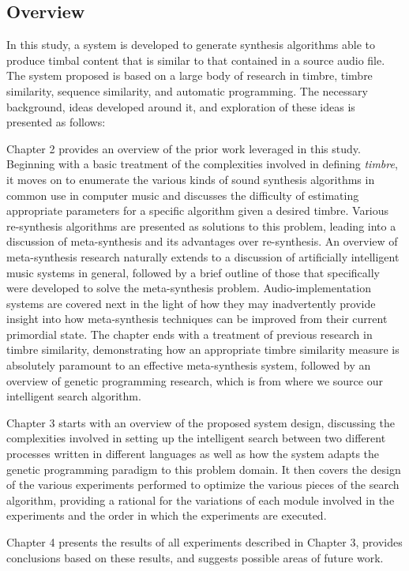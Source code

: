 \documentclass[a4paper,12pt]{report} 	%
\numberwithin{figure}{chapter}
\numberwithin{table}{chapter}
\numberwithin{equation}{chapter}
\begin{document}
\begin{flushleft}
\section{Overview}
In this study, a system is developed to generate synthesis algorithms able to produce timbal content that is similar to that contained in a source audio file. The system proposed is based on a large body of research in timbre, timbre similarity, sequence similarity, and automatic programming. The necessary background, ideas developed around it, and exploration of these ideas is presented as follows:

Chapter 2 provides an overview of the prior work leveraged in this study. Beginning with a basic treatment of the complexities involved in defining \emph{timbre}, it moves on to enumerate the various kinds of sound synthesis algorithms in common use in computer music and discusses the difficulty of estimating appropriate parameters for a specific algorithm given a desired timbre. Various re-synthesis algorithms are presented as solutions to this problem, leading into a discussion of meta-synthesis and its advantages over re-synthesis. An overview of meta-synthesis research naturally extends to a discussion of artificially intelligent music systems in general, followed by a brief outline of those that specifically were developed to solve the meta-synthesis problem. Audio-implementation systems are covered next in the light of how they may inadvertently provide insight into how meta-synthesis techniques can be improved from their current primordial state. The chapter ends with a treatment of previous research in timbre similarity, demonstrating how an appropriate timbre similarity measure is absolutely paramount to an effective meta-synthesis system, followed by an overview of genetic programming research, which is from where we source our intelligent search algorithm.

Chapter 3 starts with an overview of the proposed system design, discussing the complexities involved in setting up the intelligent search between two different processes written in different languages as well as how the system adapts the genetic programming paradigm to this problem domain. It then covers the design of the various experiments performed to optimize the various pieces of the search algorithm, providing a rational for the variations of each module involved in the experiments and the order in which the experiments are executed.

Chapter 4 presents the results of all experiments described in Chapter 3, provides conclusions based on these results, and suggests possible areas of future work.


\end{flushleft}
\end{document}
